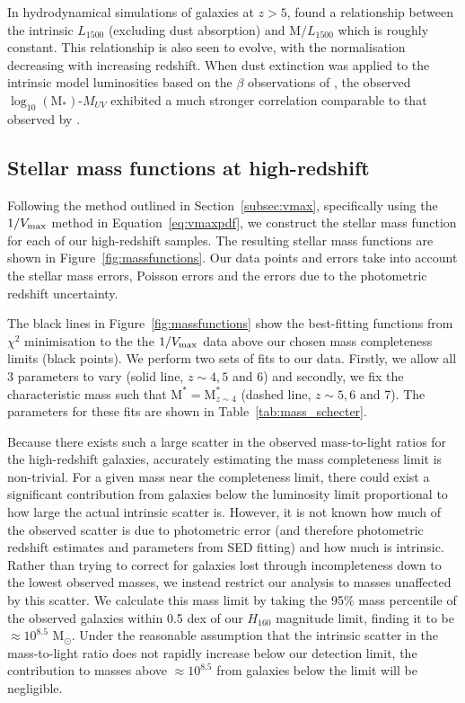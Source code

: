 In hydrodynamical simulations of galaxies at $z > 5$, \citet{Wilkins:2013kh} found a relationship between the intrinsic $L_{1500}$ (excluding dust absorption) and $\text{M}/L_{1500}$ which is roughly constant. This relationship is also seen to evolve, with the normalisation decreasing with increasing redshift. When dust extinction was applied to the intrinsic model luminosities based on the $\beta$ observations of \citet{2012ApJ...754...83B}, the observed $\log_{10} (\text{M}_{*})$-$M_{UV}$ exhibited a much stronger correlation comparable to that observed by \citet{Gonzalez:2011dn}.


\subsection{Stellar mass functions at high-redshift}\label{sec:smf}
Following the method outlined in Section~\ref{subsec:vmax}, specifically using the $1/V_{\rm{max}}$ method in Equation~\ref{eq:vmaxpdf}, we construct the stellar mass function for each of our high-redshift samples. The resulting stellar mass functions are shown in Figure~\ref{fig:massfunctions}. Our data points and errors take into account the stellar mass errors, Poisson errors and the errors due to the photometric redshift uncertainty.

The black lines in Figure~\ref{fig:massfunctions} show the best-fitting \citet{Schechter:1976gl} functions from $\chi^2$ minimisation to the the $1/V_{\rm{max}}$ data above our chosen mass completeness limits (black points). We perform two sets of fits to our data. Firstly, we allow all 3 parameters to vary (solid line, $z\sim 4, 5$ and 6) and secondly, we fix the characteristic mass such that $\text{M}^{*} = \text{M}_{z\sim4}^{*}$ (dashed line, $z\sim 5, 6$ and 7). The parameters for these fits are shown in Table~\ref{tab:mass_schecter}. 

Because there exists such a large scatter in the observed mass-to-light ratios for the high-redshift galaxies, accurately estimating the mass completeness limit is non-trivial. For a given mass near the completeness limit, there could exist a significant contribution from galaxies below the luminosity limit proportional to how large the actual intrinsic scatter is. However, it is not known how much of the observed scatter is due to photometric error (and therefore photometric redshift estimates and parameters from SED fitting) and how much is intrinsic.
Rather than trying to correct for galaxies lost through incompleteness down to the lowest observed masses, we instead restrict our analysis to masses unaffected by this scatter. We calculate this mass limit by taking the 95\% mass percentile of the observed galaxies within 0.5 dex of our $H_{160}$ magnitude limit, finding it to be $\approx 10^{8.5}$ M$_{\odot}$. Under the reasonable assumption that the intrinsic scatter in the mass-to-light ratio does not rapidly increase below our detection limit, the contribution to masses above $\approx 10^{8.5}$ from galaxies below the limit will be negligible.

